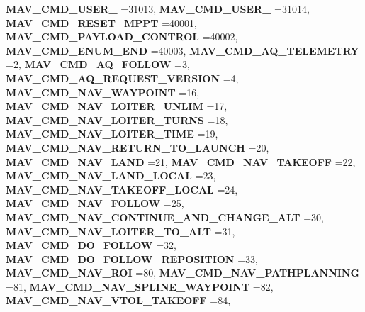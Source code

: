 \begin{DoxyCompactItemize}
\newline
\textbf{ M\+A\+V\+\_\+\+C\+M\+D\+\_\+\+U\+S\+E\+R\+\_} =31013, 
\textbf{ M\+A\+V\+\_\+\+C\+M\+D\+\_\+\+U\+S\+E\+R\+\_} =31014, 
\textbf{ M\+A\+V\+\_\+\+C\+M\+D\+\_\+\+R\+E\+S\+E\+T\+\_\+\+M\+P\+PT} =40001, 
\textbf{ M\+A\+V\+\_\+\+C\+M\+D\+\_\+\+P\+A\+Y\+L\+O\+A\+D\+\_\+\+C\+O\+N\+T\+R\+OL} =40002, 
\newline
\textbf{ M\+A\+V\+\_\+\+C\+M\+D\+\_\+\+E\+N\+U\+M\+\_\+\+E\+ND} =40003, 
\textbf{ M\+A\+V\+\_\+\+C\+M\+D\+\_\+\+A\+Q\+\_\+\+T\+E\+L\+E\+M\+E\+T\+RY} =2, 
\textbf{ M\+A\+V\+\_\+\+C\+M\+D\+\_\+\+A\+Q\+\_\+\+F\+O\+L\+L\+OW} =3, 
\textbf{ M\+A\+V\+\_\+\+C\+M\+D\+\_\+\+A\+Q\+\_\+\+R\+E\+Q\+U\+E\+S\+T\+\_\+\+V\+E\+R\+S\+I\+ON} =4, 
\newline
\textbf{ M\+A\+V\+\_\+\+C\+M\+D\+\_\+\+N\+A\+V\+\_\+\+W\+A\+Y\+P\+O\+I\+NT} =16, 
\textbf{ M\+A\+V\+\_\+\+C\+M\+D\+\_\+\+N\+A\+V\+\_\+\+L\+O\+I\+T\+E\+R\+\_\+\+U\+N\+L\+IM} =17, 
\textbf{ M\+A\+V\+\_\+\+C\+M\+D\+\_\+\+N\+A\+V\+\_\+\+L\+O\+I\+T\+E\+R\+\_\+\+T\+U\+R\+NS} =18, 
\textbf{ M\+A\+V\+\_\+\+C\+M\+D\+\_\+\+N\+A\+V\+\_\+\+L\+O\+I\+T\+E\+R\+\_\+\+T\+I\+ME} =19, 
\newline
\textbf{ M\+A\+V\+\_\+\+C\+M\+D\+\_\+\+N\+A\+V\+\_\+\+R\+E\+T\+U\+R\+N\+\_\+\+T\+O\+\_\+\+L\+A\+U\+N\+CH} =20, 
\textbf{ M\+A\+V\+\_\+\+C\+M\+D\+\_\+\+N\+A\+V\+\_\+\+L\+A\+ND} =21, 
\textbf{ M\+A\+V\+\_\+\+C\+M\+D\+\_\+\+N\+A\+V\+\_\+\+T\+A\+K\+E\+O\+FF} =22, 
\textbf{ M\+A\+V\+\_\+\+C\+M\+D\+\_\+\+N\+A\+V\+\_\+\+L\+A\+N\+D\+\_\+\+L\+O\+C\+AL} =23, 
\newline
\textbf{ M\+A\+V\+\_\+\+C\+M\+D\+\_\+\+N\+A\+V\+\_\+\+T\+A\+K\+E\+O\+F\+F\+\_\+\+L\+O\+C\+AL} =24, 
\textbf{ M\+A\+V\+\_\+\+C\+M\+D\+\_\+\+N\+A\+V\+\_\+\+F\+O\+L\+L\+OW} =25, 
\textbf{ M\+A\+V\+\_\+\+C\+M\+D\+\_\+\+N\+A\+V\+\_\+\+C\+O\+N\+T\+I\+N\+U\+E\+\_\+\+A\+N\+D\+\_\+\+C\+H\+A\+N\+G\+E\+\_\+\+A\+LT} =30, 
\textbf{ M\+A\+V\+\_\+\+C\+M\+D\+\_\+\+N\+A\+V\+\_\+\+L\+O\+I\+T\+E\+R\+\_\+\+T\+O\+\_\+\+A\+LT} =31, 
\newline
\textbf{ M\+A\+V\+\_\+\+C\+M\+D\+\_\+\+D\+O\+\_\+\+F\+O\+L\+L\+OW} =32, 
\textbf{ M\+A\+V\+\_\+\+C\+M\+D\+\_\+\+D\+O\+\_\+\+F\+O\+L\+L\+O\+W\+\_\+\+R\+E\+P\+O\+S\+I\+T\+I\+ON} =33, 
\textbf{ M\+A\+V\+\_\+\+C\+M\+D\+\_\+\+N\+A\+V\+\_\+\+R\+OI} =80, 
\textbf{ M\+A\+V\+\_\+\+C\+M\+D\+\_\+\+N\+A\+V\+\_\+\+P\+A\+T\+H\+P\+L\+A\+N\+N\+I\+NG} =81, 
\newline
\textbf{ M\+A\+V\+\_\+\+C\+M\+D\+\_\+\+N\+A\+V\+\_\+\+S\+P\+L\+I\+N\+E\+\_\+\+W\+A\+Y\+P\+O\+I\+NT} =82, 
\textbf{ M\+A\+V\+\_\+\+C\+M\+D\+\_\+\+N\+A\+V\+\_\+\+V\+T\+O\+L\+\_\+\+T\+A\+K\+E\+O\+FF} =84, 

\end{DoxyCompactItemize}
